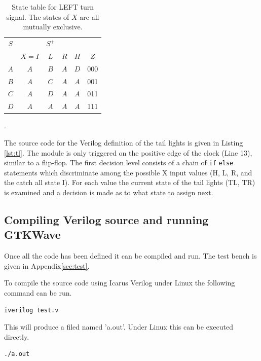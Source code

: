 \documentclass[12pt]{article}
\begin{document}
\begin{table}[htbp!]
\center
\begin{tabular}[t]{c|cccc|c}
$S$ &       & $S^+$ &     &     & \\
    & $X=I$ & $L$   & $R$ & $H$ & $Z$ \\
\hline
$A$ & $A$   & $B$   & $A$ & $D$ & 000 \\
$B$ & $A$   & $C$   & $A$ & $A$ & 001 \\
$C$ & $A$   & $D$   & $A$ & $A$ & 011 \\
$D$ & $A$   & $A$   & $A$ & $A$ & 111 \\
\end{tabular}
\caption{State table for LEFT turn signal.
The states of $X$ are all mutually exclusive.}
\label{tbl:leftstate}.
\end{table}

The source code for the Verilog definition of the tail lights
is given in Listing \ref{lst:tl}.
The module is only triggered on the positive edge of the clock (Line 13),
similar to a flip-flop.
The first decision level consists of a chain of \verb+if+ \verb+else+
statements which discriminate among the possible X input values (H, L, R, and
the catch all state I).
For each value the current state of the tail lights (TL, TR) is examined
and a decision is made as to what state to assign next.




\subsection{Compiling Verilog source and running GTKWave}

Once all the code has been defined it can be compiled and run.
The test bench is given in Appendix\ref{sec:test}.

To compile the source code using Icarus Verilog\cite{VERILOG}
under Linux the following command can be run.

\begin{verbatim}
iverilog test.v
\end{verbatim}

This will produce a filed named 'a.out'.
Under Linux this can be executed directly.

\begin{verbatim}
./a.out
\end{verbatim}
\end{document}
